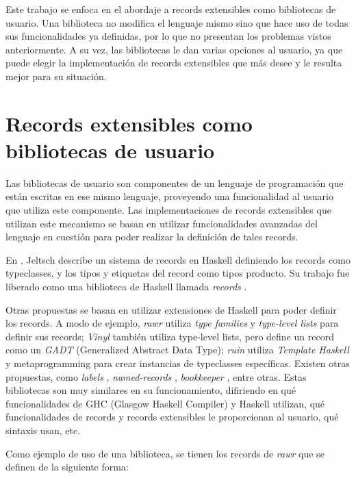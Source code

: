 Este trabajo se enfoca en el abordaje a records extensibles como bibliotecas de usuario. Una biblioteca no modifica el lenguaje mismo sino que hace uso de todas sus funcionalidades ya definidas, por lo que no presentan los problemas vistos anteriormente. A su vez, las bibliotecas le dan varias opciones al usuario, ya que puede elegir la implementación de records extensibles que más desee y le resulta mejor para su situación.

\section{Records extensibles como bibliotecas de usuario}

Las bibliotecas de usuario son componentes de un lenguaje de programación que están escritas en ese mismo lenguaje, proveyendo una funcionalidad al usuario que utiliza este componente. Las implementaciones de records extensibles que utilizan este mecanismo se basan en utilizar funcionalidades avanzadas del lenguaje en cuestión para poder realizar la definición de tales records.

En \cite{Jeltsch:2010:GRC:1836089.1836108}, Jeltsch describe un sistema de records en Haskell definiendo los records como typeclasses, y los tipos y etiquetas del record como tipos producto. Su trabajo fue liberado como una biblioteca de Haskell llamada \textit{records} \cite{HaskellRecords}.

Otras propuestas se basan en utilizar extensiones de Haskell para poder definir los records. A modo de ejemplo, \textit{rawr} \cite{HaskellRawr} utiliza \textit{type families} y \textit{type-level lists} para definir sus records; \textit{Vinyl} \cite{HaskellVinyl} también utiliza type-level lists, pero define un record como un \textit{GADT} (Generalized Abstract Data Type); \textit{ruin} \cite{HaskellRuin} utiliza \textit{Template Haskell} y metaprogramming para crear instancias de typeclasses específicas. Existen otras propuestas, como \textit{labels} \cite{HaskellLabels}, \textit{named-records} \cite{HaskellNamedRecords}, \textit{bookkeeper} \cite{HaskellBookkeeper}, entre otras. Estas bibliotecas son muy similares en su funcionamiento, difiriendo en qué funcionalidades de GHC (Glasgow Haskell Compiler) y Haskell utilizan, qué funcionalidades de records y records extensibles le proporcionan al usuario, qué sintaxis usan, etc.

Como ejemplo de uso de una biblioteca, se tienen los records de \textit{rawr} que se definen de la siguiente forma:

